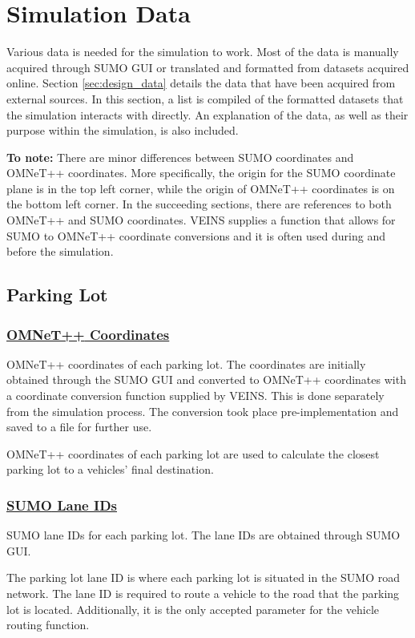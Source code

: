 \section{Simulation Data}
Various data is needed for the simulation to work. Most of the data is manually acquired through \ac{SUMO} \ac{GUI} or translated and formatted from datasets acquired online. Section \ref{sec:design_data} details the data that have been acquired from external sources. In this section, a list is compiled of the formatted datasets that the simulation interacts with directly. An explanation of the data, as well as their purpose within the simulation, is also included.

\textbf{To note:} There are minor differences between \ac{SUMO} coordinates and \ac{OMNeT++} coordinates. More specifically, the origin for the \ac{SUMO} coordinate plane is in the top left corner, while the origin of \ac{OMNeT++} coordinates is on the bottom left corner. In the succeeding sections, there are references to both \ac{OMNeT++} and \ac{SUMO} coordinates. \ac{VEINS} supplies a function that allows for \ac{SUMO} to \ac{OMNeT++} coordinate conversions and it is often used during and before the simulation.

\subsection{Parking Lot}
\subsubsection{\underline{\ac{OMNeT++} Coordinates}}
\begin{description}[leftmargin=8em,style=nextline]
  \item[Explanation] \ac{OMNeT++} coordinates of each parking lot. The coordinates are initially obtained through the \ac{SUMO} GUI and converted to \ac{OMNeT++} coordinates with a coordinate conversion function supplied by \ac{VEINS}. This is done separately from the simulation process. The conversion took place pre-implementation and saved to a file for further use.
  \item[Purpose] \ac{OMNeT++} coordinates of each parking lot are used to calculate the closest parking lot to a vehicles' final destination.
\end{description}

\subsubsection{\underline{\ac{SUMO} Lane IDs}}
\begin{description}[leftmargin=8em,style=nextline]
  \item[Explanation] \ac{SUMO} lane IDs for each parking lot. The lane IDs are obtained through \ac{SUMO} GUI.
  \item[Purpose] The parking lot lane ID is where each parking lot is situated in the \ac{SUMO} road network. The lane ID is required to route a vehicle to the road that the parking lot is located. Additionally, it is the only accepted parameter for the vehicle routing function.
\end{description}

